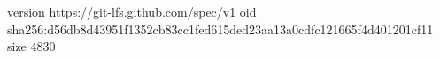 version https://git-lfs.github.com/spec/v1
oid sha256:d56db8d43951f1352cb83cc1fed615ded23aa13a0cdfc121665f4d401201cf11
size 4830
